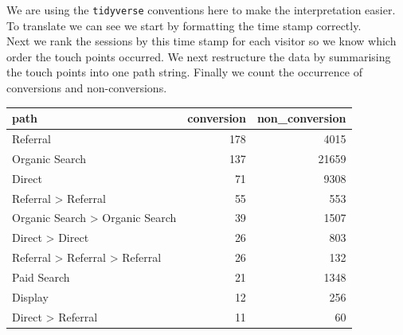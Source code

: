 \documentclass[]{book}
\newenvironment{Shaded}{\begin{snugshade}}{\end{snugshade}}
\newcommand{\KeywordTok}[1]{\textcolor[rgb]{0.13,0.29,0.53}{\textbf{#1}}}
\newcommand{\DataTypeTok}[1]{\textcolor[rgb]{0.13,0.29,0.53}{#1}}
\newcommand{\DecValTok}[1]{\textcolor[rgb]{0.00,0.00,0.81}{#1}}
\newcommand{\StringTok}[1]{\textcolor[rgb]{0.31,0.60,0.02}{#1}}
\newcommand{\OperatorTok}[1]{\textcolor[rgb]{0.81,0.36,0.00}{\textbf{#1}}}
\newcommand{\NormalTok}[1]{#1}
\begin{document}
We are using the \texttt{tidyverse} conventions here to make the
interpretation easier. To translate we can see we start by formatting
the time stamp correctly.\\
Next we rank the sessions by this time stamp for each visitor so we know
which order the touch points occurred. We next restructure the data by
summarising the touch points into one path string. Finally we count the
occurrence of conversions and non-conversions.

\begin{Shaded}
\end{Shaded}

\begin{tabular}{l|r|r}
\hline
path & conversion & non\_conversion\\
\hline
Referral & 178 & 4015\\
\hline
Organic Search & 137 & 21659\\
\hline
Direct & 71 & 9308\\
\hline
Referral > Referral & 55 & 553\\
\hline
Organic Search > Organic Search & 39 & 1507\\
\hline
Direct > Direct & 26 & 803\\
\hline
Referral > Referral > Referral & 26 & 132\\
\hline
Paid Search & 21 & 1348\\
\hline
Display & 12 & 256\\
\hline
Direct > Referral & 11 & 60\\
\hline
\end{tabular}
\end{document}
